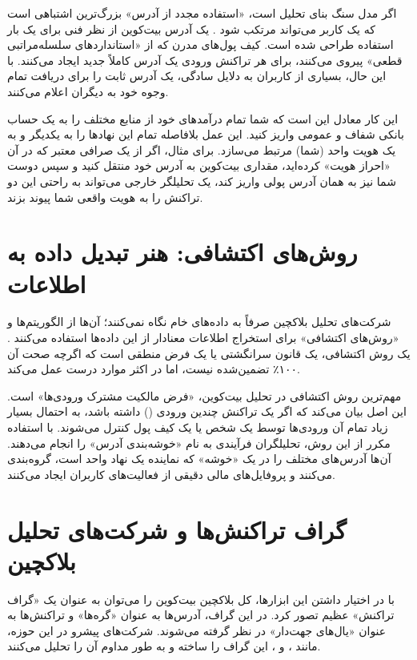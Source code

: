 اگر مدل  سنگ بنای تحلیل است، «استفاده مجدد از آدرس» بزرگ‌ترین اشتباهی است که یک کاربر می‌تواند مرتکب شود \cite{antonopoulos_mastering}. یک آدرس بیت‌کوین از نظر فنی برای یک بار استفاده طراحی شده است. کیف پول‌های مدرن که از «استانداردهای سلسله‌مراتبی قطعی» پیروی می‌کنند، برای هر تراکنش ورودی یک آدرس کاملاً جدید ایجاد می‌کنند. با این حال، بسیاری از کاربران به دلایل سادگی، یک آدرس ثابت را برای دریافت تمام وجوه خود به دیگران اعلام می‌کنند.

این کار معادل این است که شما تمام درآمدهای خود از منابع مختلف را به یک حساب بانکی شفاف و عمومی واریز کنید. این عمل بلافاصله تمام این نهادها را به یکدیگر و به یک هویت واحد (شما) مرتبط می‌سازد. برای مثال، اگر از یک صرافی معتبر که در آن «احراز هویت» کرده‌اید، مقداری بیت‌کوین به آدرس  خود منتقل کنید و سپس دوست شما نیز به همان آدرس  پولی واریز کند، یک تحلیلگر خارجی می‌تواند به راحتی این دو تراکنش را به هویت واقعی شما پیوند بزند.

\section{روش‌های اکتشافی: هنر تبدیل داده به اطلاعات}

شرکت‌های تحلیل بلاکچین صرفاً به داده‌های خام نگاه نمی‌کنند؛ آن‌ها از الگوریتم‌ها و «روش‌های اکتشافی» برای استخراج اطلاعات معنادار از این داده‌ها استفاده می‌کنند \cite{narayanan_deanonymizing}. یک روش اکتشافی، یک قانون سرانگشتی یا یک فرض منطقی است که اگرچه صحت آن ۱۰۰٪ تضمین‌شده نیست، اما در اکثر موارد درست عمل می‌کند.

مهم‌ترین روش اکتشافی در تحلیل بیت‌کوین، «فرض مالکیت مشترک ورودی‌ها» است. این اصل بیان می‌کند که اگر یک تراکنش چندین ورودی () داشته باشد، به احتمال بسیار زیاد تمام آن ورودی‌ها توسط یک شخص یا یک کیف پول کنترل می‌شوند. با استفاده مکرر از این روش، تحلیلگران فرآیندی به نام «خوشه‌بندی آدرس» را انجام می‌دهند. آن‌ها آدرس‌های مختلف را در یک «خوشه» که نماینده یک نهاد واحد است، گروه‌بندی می‌کنند و پروفایل‌های مالی دقیقی از فعالیت‌های کاربران ایجاد می‌کنند.

\section{گراف تراکنش‌ها و شرکت‌های تحلیل بلاکچین}

با در اختیار داشتن این ابزارها، کل بلاکچین بیت‌کوین را می‌توان به عنوان یک «گراف تراکنش» عظیم تصور کرد. در این گراف، آدرس‌ها به عنوان «گره‌ها» و تراکنش‌ها به عنوان «یال‌های جهت‌دار» در نظر گرفته می‌شوند. شرکت‌های پیشرو در این حوزه، مانند ،  و ، این گراف را ساخته و به طور مداوم آن را تحلیل می‌کنند.

